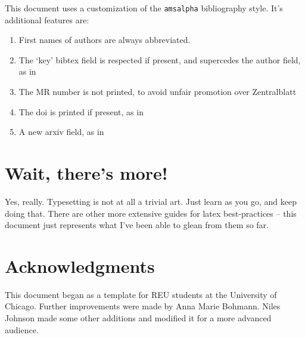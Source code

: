 \documentclass[11pt,oneside,draft]{amsart}
\begin{document}
This document uses a customization of the \texttt{amsalpha}
bibliography style.  It's additional features are:
\begin{enumerate}
\item First names of authors are always abbreviated.
\item The `key' bibtex field is respected if present, and supercedes
  the author field, as in \cite{ATC,sage}
\item The MR number is not printed, to avoid unfair promotion over
  Zentralblatt
\item The doi is printed if present, as in \cite{JN2010Complex}
\item A new arxiv field, as in \cite{GO2012Infinite,JN2010Complex}
\end{enumerate}
 

\section{Wait, there's more!}

Yes, really.  Typesetting is not at all a trivial art.  Just learn as
you go, and keep doing that.  There are other more extensive guides
for latex best-practices -- this document just represents what I've
been able to glean from them so far.

\section*{Acknowledgments}  

This document began as a template for REU students at the University
of Chicago.  Further improvements were made by Anna Marie Bohmann.
Niles Johnson made some other additions and modified it for a more
advanced audience.


%
\end{document}
